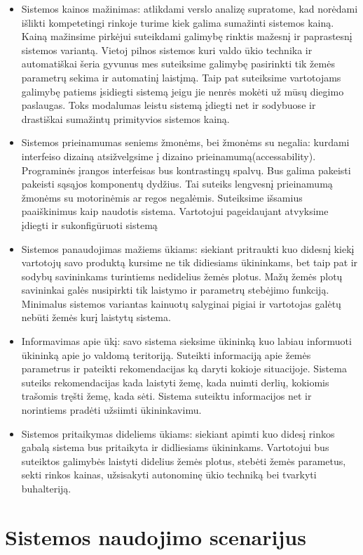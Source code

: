 \documentclass[oneside]{VUMIFPSkursinis}
\begin{document}
	\begin{itemize}
		\item{Sistemos kainos mažinimas: atlikdami verslo analizę supratome, kad norėdami išlikti kompetetingi rinkoje turime kiek galima sumažinti sistemos kainą. Kainą mažinsime pirkėjui suteikdami galimybę rinktis mažesnį ir paprastesnį sistemos variantą.  Vietoj pilnos sistemos kuri valdo ūkio technika ir automatiškai šeria gyvunus mes suteiksime galimybę pasirinkti tik žemės parametrų sekima ir automatinį laistįmą. Taip pat suteiksime vartotojams galimybę patiems įsidiegti sistemą jeigu jie nenrės mokėti už mūsų diegimo paslaugas. Toks modalumas leistu sistemą įdiegti net ir sodybuose ir drastiškai sumažintų primityvios sistemos kainą.}
		\item{Sistemos prieinamumas seniems žmonėms, bei žmonėms su negalia: kurdami interfeiso dizainą atsižvelgsime į dizaino prieinamumą(accessability). Programinės įrangos interfeisas bus kontrastingų spalvų. Bus galima pakeisti pakeisti sąsąjos komponentų dydžius. Tai suteiks lengvesnį prieinamumą žmonėms su motorinėmis ar regos negalėmis. Suteiksime išsamius paaiškinimus kaip naudotis sistema. Vartotojui pageidaujant atvyksime įdiegti ir sukonfigūruoti sistemą}
		\item{Sistemos panaudojimas mažiems ūkiams: siekiant pritraukti kuo didesnį kiekį vartotojų savo produktą kursime ne tik didiesiams ūkininkams, bet taip pat ir sodybų savininkams turintiems nedidelius žemės plotus. Mažų žemės plotų savininkai galės nusipirkti tik laistymo ir parametrų stebėjimo funkciją. Minimalus sistemos variantas kainuotų salyginai pigiai ir vartotojas galėtų nebūti žemės kurį laistytų sistema.}
		\item{Informavimas apie ūkį: savo sistema sieksime ūkininką kuo labiau informuoti ūkininką apie jo valdomą teritoriją. Suteikti informaciją apie žemės parametrus ir pateikti rekomendacijas ką daryti kokioje situacijoje. Sistema suteiks rekomendacijas kada laistyti žemę, kada nuimti derlių, kokiomis trašomis tręšti žemę, kada sėti. Sistema suteiktu informacijos net ir norintiems pradėti užsiimti ūkininkavimu.}
		\item{Sistemos pritaikymas dideliems ūkiams: siekiant apimti kuo didesį rinkos gabalą sistema bus pritaikyta ir didliesiams ūkininkams. Vartotojui bus suteiktos galimybės laistyti didelius žemės plotus, stebėti žemės parametus, sekti rinkos kainas, užsisakyti autonominę ūkio techniką bei tvarkyti buhalteriją.}
	\end{itemize}
\section{Sistemos naudojimo scenarijus}
\end{document}
